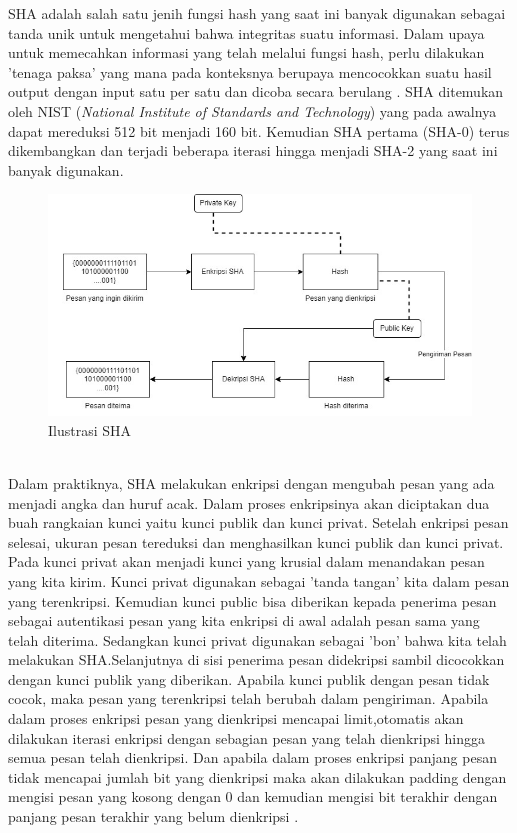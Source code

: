 SHA adalah salah satu jenih fungsi hash yang saat ini banyak digunakan sebagai tanda unik untuk mengetahui bahwa integritas suatu informasi. Dalam upaya untuk memecahkan informasi yang telah melalui fungsi hash, perlu dilakukan 'tenaga paksa' yang mana pada konteksnya berupaya mencocokkan suatu hasil output dengan input satu per satu dan dicoba secara berulang \cite{stallings1999cryptography}. SHA ditemukan oleh NIST (\emph{National Institute of Standards and Technology}) yang pada awalnya dapat mereduksi 512 bit menjadi 160 bit. Kemudian SHA pertama (SHA-0) terus dikembangkan dan terjadi beberapa iterasi hingga menjadi SHA-2 yang saat ini banyak digunakan.
\\
\begin{figure}
	\centering
	\includegraphics[scale=0.5]{gambar/sha.jpg}
	\caption{Ilustrasi SHA}
	\label{fig:shaillustrated}
\end{figure}
\\
Dalam praktiknya, SHA melakukan enkripsi dengan mengubah pesan yang ada menjadi angka dan huruf acak. Dalam proses enkripsinya akan diciptakan dua buah rangkaian kunci yaitu kunci publik dan kunci privat. Setelah enkripsi pesan selesai, ukuran pesan tereduksi dan menghasilkan kunci publik dan kunci privat. Pada kunci privat akan menjadi kunci yang krusial dalam menandakan pesan yang kita kirim. Kunci privat digunakan sebagai 'tanda tangan' kita dalam pesan yang terenkripsi. Kemudian kunci public bisa diberikan kepada penerima pesan sebagai autentikasi pesan yang kita enkripsi di awal adalah pesan sama yang telah diterima. Sedangkan kunci privat digunakan sebagai 'bon' bahwa kita telah melakukan SHA.Selanjutnya di sisi penerima pesan didekripsi sambil dicocokkan dengan kunci publik yang diberikan. Apabila kunci publik dengan pesan tidak cocok, maka pesan yang terenkripsi telah berubah dalam pengiriman. Apabila dalam proses enkripsi pesan yang dienkripsi mencapai limit,otomatis akan dilakukan iterasi enkripsi dengan sebagian pesan yang telah dienkripsi hingga semua pesan telah dienkripsi. Dan apabila dalam proses enkripsi panjang pesan tidak mencapai jumlah bit yang dienkripsi maka akan dilakukan padding dengan mengisi pesan yang kosong dengan 0 dan kemudian mengisi bit terakhir dengan panjang pesan terakhir yang belum dienkripsi \cite{stallings1999cryptography}.

